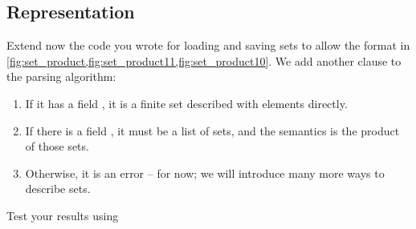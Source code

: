 
\subsection{Representation}


%

%

\begin{codeexercise}
    Extend now the code you wrote for loading and saving sets to allow the format in \cref{fig:set_product,fig:set_product11,fig:set_product10}.
    We add another clause to the parsing algorithm:
    \begin{enumerate}
        \item If it has a field , it is a finite set described with elements directly.
        \item If there is a field , it must be a list of sets, and the semantics is the product of those sets.
        \item Otherwise, it is an error -- for now; we will introduce many more ways to describe sets.
    \end{enumerate}
    Test your results using
\end{codeexercise}

